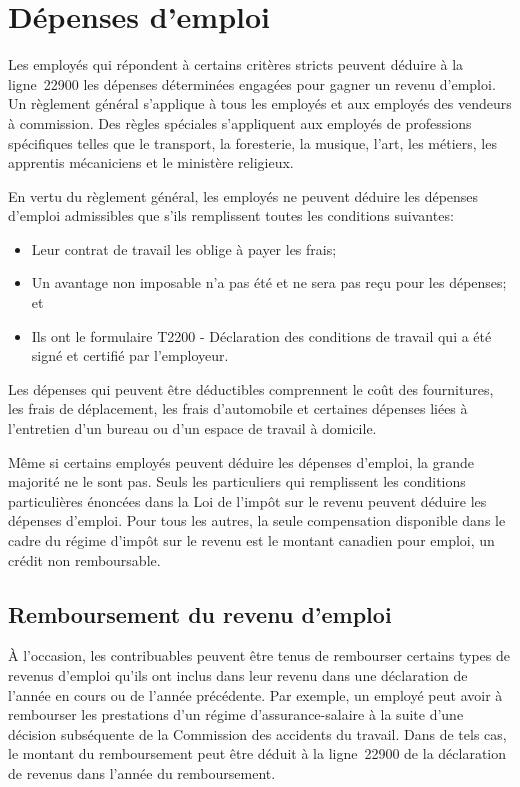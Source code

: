 \section{Dépenses d'emploi}
\begin{intro}
	Les employés qui répondent à certains critères stricts peuvent déduire à la ligne~22900 les dépenses déterminées engagées pour gagner un revenu d'emploi. Un règlement général s'applique à tous les employés et aux employés des vendeurs à commission. Des règles spéciales s'appliquent aux employés de professions spécifiques telles que le transport, la foresterie, la musique, l'art, les métiers, les apprentis mécaniciens et le ministère religieux.
\end{intro}

En vertu du règlement général, les employés ne peuvent déduire les dépenses d'emploi admissibles que s'ils remplissent toutes les conditions suivantes:
\begin{itemize}
	\item Leur contrat de travail les oblige à payer les frais;
	\item Un avantage non imposable n'a pas été et ne sera pas reçu pour les dépenses; et
	\item Ils ont le formulaire T2200 - Déclaration des conditions de travail qui a été signé et certifié par l'employeur.
\end{itemize}

Les dépenses qui peuvent être déductibles comprennent le coût des fournitures, les frais de déplacement, les frais d'automobile et certaines dépenses liées à l'entretien d'un bureau ou d'un espace de travail à domicile.

Même si certains employés peuvent déduire les dépenses d'emploi, la grande majorité ne le sont pas. Seuls les particuliers qui remplissent les conditions particulières énoncées dans la Loi de l'impôt sur le revenu peuvent déduire les dépenses d'emploi. Pour tous les autres, la seule compensation disponible dans le cadre du régime d'impôt sur le revenu est le montant canadien pour emploi, un crédit non remboursable.


\subsection{Remboursement du revenu d'emploi}
À l'occasion, les contribuables peuvent être tenus de rembourser certains types de revenus d'emploi qu'ils ont inclus dans leur revenu dans une déclaration de l'année en cours ou de l'année précédente. Par exemple, un employé peut avoir à rembourser les prestations d'un régime d'assurance-salaire à la suite d'une décision subséquente de la Commission des accidents du travail. Dans de tels cas, le montant du remboursement peut être déduit à la ligne~22900 de la déclaration de revenus dans l'année du remboursement.

